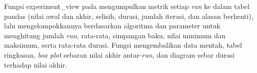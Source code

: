 Fungsi experiment\_view pada  mengumpulkan metrik setiap \textit{run} ke dalam tabel pandas (nilai awal dan akhir, selisih, durasi, jumlah iterasi, dan alasan berhenti), lalu mengelompokkannya berdasarkan algoritma dan parameter untuk menghitung jumlah \textit{run}, rata-rata, simpangan baku, nilai minimum dan maksimum, serta rata-rata durasi. Fungsi mengembalikan data mentah, tabel ringkasan, \textit{box plot} sebaran nilai akhir antar-\textit{run}, dan diagram sebar durasi terhadap nilai akhir.

